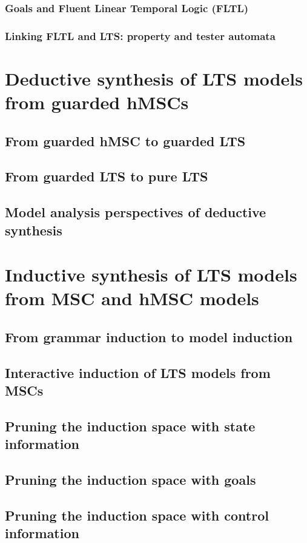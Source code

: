 \documentclass[dvips,a4paper,11pt]{report}
\begin{document}
    \subsection{Goals and Fluent Linear Temporal Logic (FLTL)}
    \subsection{Linking FLTL and LTS: property and tester automata}
\chapter{Deductive synthesis of LTS models from guarded hMSCs}
  \section{From guarded hMSC to guarded LTS}
  \section{From guarded LTS to pure LTS}
  \section{Model analysis perspectives of deductive synthesis}
\chapter{Inductive synthesis of LTS models from MSC and hMSC models\label{chapter:inductive-synthesis}}
  \section{From grammar induction to model induction}
  \section{Interactive induction of LTS models from MSCs}
  \section{Pruning the induction space with state information}
  \section{Pruning the induction space with goals}
  \section{Pruning the induction space with control information}
\end{document}
